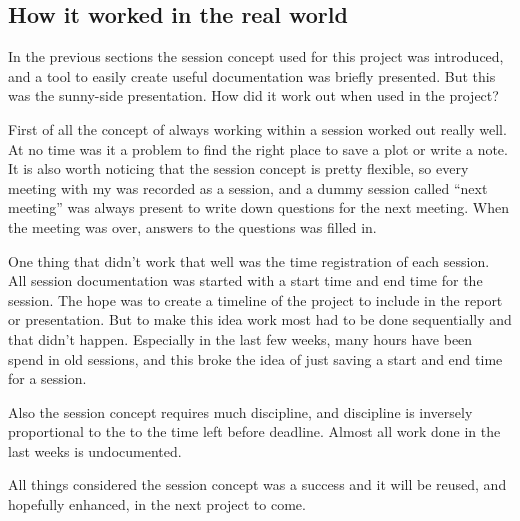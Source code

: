 \subsection{How it worked in the real world}
In the previous sections the session concept used for this project was introduced, and a tool to easily create useful documentation was briefly presented. But this was the sunny-side presentation. How did it work out when used in the project? \par
First of all the concept of always working within a session worked out really well. At no time was it a problem to find the right place to save a plot or write a note. It is also worth noticing that the session concept is pretty flexible, so every meeting with my  was recorded as a session, and a dummy session called ``next meeting'' was always present to write down questions for the next meeting. When the meeting was over, answers to the questions was filled in. \par
One thing that didn't work that well was the time registration of each session. All session documentation was started with a start time and end time for the session. The hope was to create a timeline of the project to include in the report or presentation. But to make this idea work most had to be done sequentially and that didn't happen. Especially in the last few weeks, many hours have been spend in old sessions, and this broke the idea of just saving a start and end time for a session.\par
Also the session concept requires much discipline, and discipline is inversely proportional to the to the time left before deadline. Almost all work done in the last weeks is undocumented.\par
All things considered the session concept was a success and it will be reused, and hopefully enhanced, in the next project to come.


